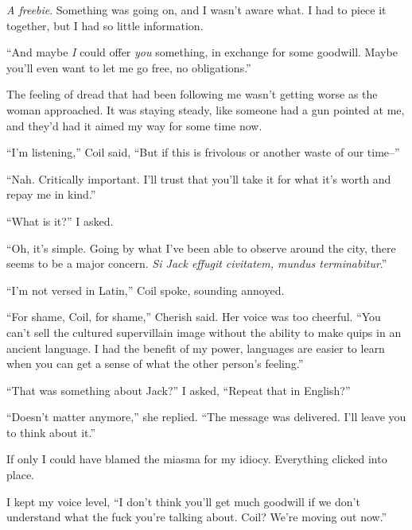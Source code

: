 \emph{A freebie}.  Something was going on, and I wasn't aware what.  I had to piece it together, but I had so little information.



``And maybe \emph{I }could offer \emph{you} something, in exchange for some goodwill.  Maybe you'll even want to let me go free, no obligations.''



The feeling of dread that had been following me wasn't getting worse as the woman approached.  It was staying steady, like someone had a gun pointed at me, and they'd had it aimed my way for some time now.



``I'm listening,'' Coil said, ``But if this is frivolous or another waste of our time--''



``Nah.  Critically important.  I'll trust that you'll take it for what it's worth and repay me in kind.''



``What is it?'' I asked.



``Oh, it's simple.  Going by what I've been able to observe around the city, there seems to be a major concern.  \emph{Si Jack effugit civitatem, mundus terminabitur}.''



``I'm not versed in Latin,''  Coil spoke, sounding annoyed.



``For shame, Coil, for shame,'' Cherish said.  Her voice was too cheerful. ``You can't sell the cultured supervillain image without the ability to make quips in an ancient language.  I had the benefit of my power, languages are easier to learn when you can get a sense of what the other person's feeling.''



``That was something about Jack?''  I asked,  ``Repeat that in English?''



``Doesn't matter anymore,'' she replied.  ``The message was delivered.  I'll leave you to think about it.''



If only I could have blamed the miasma for my idiocy.  Everything clicked into place.



I kept my voice level, ``I don't think you'll get much goodwill if we don't understand what the fuck you're talking about.  Coil?  We're moving out now.''



